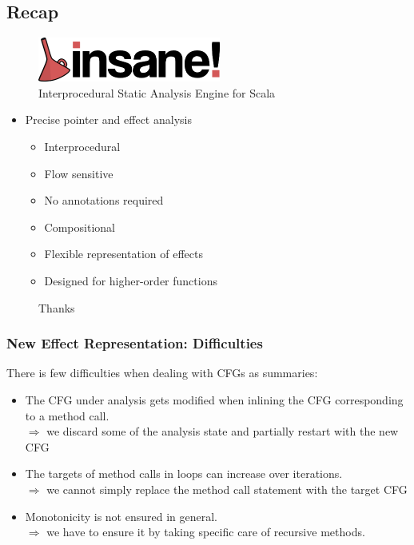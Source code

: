 \documentclass[hyperref={pdfpagelabels=false}]{beamer}
\begin{document}
\subsection{Recap}
\begin{frame}[label=overview]
    \begin{figure}[t]
        \includegraphics[width=60mm]{../../../logo.png}\\
        Interprocedural Static Analysis Engine for Scala
    \end{figure}

    \begin{itemize}
        \item Precise pointer and effect analysis
            \begin{itemize}
                \item Interprocedural
                \item Flow sensitive
                \item No annotations required
                \item Compositional
                \item Flexible representation of effects
                \item Designed for higher-order functions
            \end{itemize}
    \end{itemize}
\end{frame}
\begin{frame}[fragile]
    \begin{figure}
    \begin{center}
    Thanks
    \end{center}
    \end{figure}
\end{frame}
\begin{frame}[fragile]

\frametitle{New Effect Representation: Difficulties}
    There is few difficulties when dealing with CFGs as summaries:
    \begin{itemize}
        \item The CFG under analysis gets modified when inlining the CFG
        corresponding to a method call.\\
            $\Rightarrow$ we discard some of the analysis state and partially restart with the new CFG

        \item The targets of method calls in loops can increase over iterations.\\
            $\Rightarrow$ we cannot simply replace the method call statement with the target CFG

        \item Monotonicity is not ensured in general.\\
            $\Rightarrow$ we have to ensure it by taking specific care of
            recursive methods.
    \end{itemize}
\end{frame}
\end{document}
